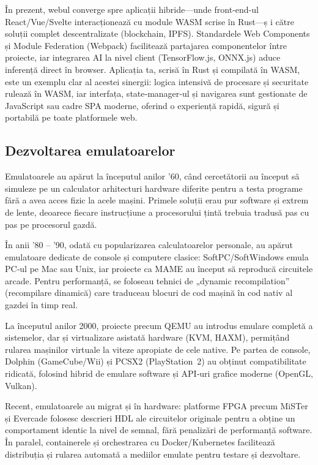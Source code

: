 \documentclass[titlepage,12pt]{article}
\begin{document}
În prezent, webul converge spre aplicații hibride—unde front‑end-ul React/Vue/Svelte interacționează cu module WASM scrise în Rust—ș i către soluții complet descentralizate (blockchain, IPFS). Standardele Web Components și Module Federation (Webpack) facilitează partajarea componentelor între proiecte, iar integrarea AI la nivel client (TensorFlow.js, ONNX.js) aduce inferență direct în browser. Aplicația ta, scrisă în Rust și compilată în WASM, este un exemplu clar al acestei sinergii: logica intensivă de procesare și securitate rulează în WASM, iar interfața, state‑manager‑ul și navigarea sunt gestionate de JavaScript sau cadre SPA moderne, oferind o experiență rapidă, sigură și portabilă pe toate platformele web.

\subsection{Dezvoltarea emulatoarelor}

Emulatoarele au apărut la începutul anilor ’60, când cercetătorii au început să simuleze pe un calculator arhitecturi hardware diferite pentru a testa programe fără a avea acces fizic la acele mașini. Primele soluții erau pur software și extrem de lente, deoarece fiecare instrucțiune a procesorului țintă trebuia tradusă pas cu pas pe procesorul gazdă.

În anii ’80 – ’90, odată cu popularizarea calculatoarelor personale, au apărut emulatoare dedicate de console și computere clasice: SoftPC/SoftWindows emula PC‑ul pe Mac sau Unix, iar proiecte ca MAME au început să reproducă circuitele arcade. Pentru performanță, se foloseau tehnici de „dynamic recompilation” (recompilare dinamică) care traduceau blocuri de cod mașină în cod nativ al gazdei în timp real.

La începutul anilor 2000, proiecte precum QEMU au introdus emulare completă a sistemelor, dar și virtualizare asistată hardware (KVM, HAXM), permițând rularea mașinilor virtuale la viteze apropiate de cele native. Pe partea de console, Dolphin (GameCube/Wii) și PCSX2 (PlayStation 2) au obținut compatibilitate ridicată, folosind hibrid de emulare software și API‑uri grafice moderne (OpenGL, Vulkan).

Recent, emulatoarele au migrat și în hardware: platforme FPGA precum MiSTer și Evercade folosesc descrieri HDL ale circuitelor originale pentru a obține un comportament identic la nivel de semnal, fără penalizări de performanță software. În paralel, containerele și orchestrarea cu Docker/Kubernetes facilitează distribuția și rularea automată a mediilor emulate pentru testare și dezvoltare.
\end{document}
